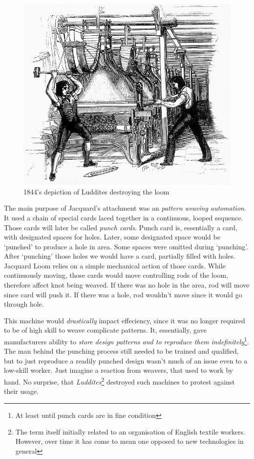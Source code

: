 \documentclass{article}
\begin{document}
            \begin{figure}
                \centering
                \includegraphics[scale=0.25]{images/misc/luddites.jpg}
                \caption{1844's depiction of Luddites destroying the loom}
            \end{figure}

            The main purpose of Jacquard's attachment was an \emph{pattern weaving automation}. It used a chain of special cards laced together in a continuous, looped sequence.
            Those cards will later be called \emph{punch cards}. Punch card is, essentially a card, with designated spaces for holes. Later, some designated space would be `punched'
            to produce a hole in area. Some spaces were omitted during `punching'. After `punching' those holes we would have a card, partially filled with holes. Jacquard Loom
            relies on a simple mechanical action of those cards. While continuously moving, those cards would move controlling rods of the loom, therefore affect knot being weaved. 
            If there was no hole in the area, rod will move since card will push it. If there was a hole, rod wouldn't move since it would go through hole. \par


            This machine would \emph{drastically} impact effeciency, since it was no longer required to be of high skill to weave complicate patterns. It, essentially, gave
            manufacturers ability to \emph{store design patterns and to reproduce them indefinitely}\footnote{At least until punch cards are in fine condition}. The man behind
            the punching process still needed to be trained and qualified, but to just reproduce a readily punched design wasn't much of an issue even to a low-skill worker.
            Just imagine a reaction from weavers, that used to work by hand. No surprise, that \emph{Luddites}\footnote{The term itself initially related to an organisation 
            of English textile workers. However, over time it has come to mean one opposed to new technologies in general}
            destroyed such machines to protest against their usage. \par
            
\end{document}
